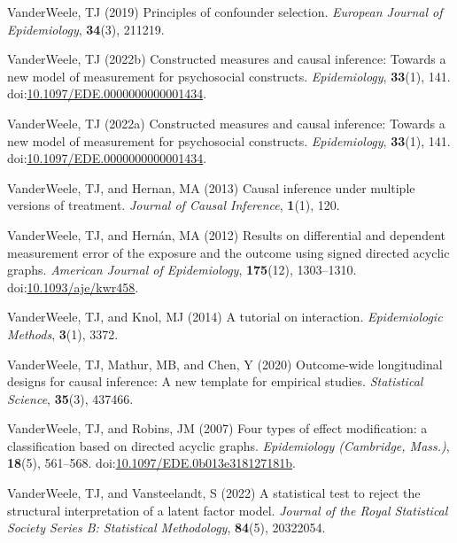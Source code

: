 \documentclass[
  singlecolumn,
  9pt]{article}
\begin{document}
\begin{CSLReferences}
VanderWeele, TJ (2019) Principles of confounder selection.
\emph{European Journal of Epidemiology}, \textbf{34}(3), 211219.

VanderWeele, TJ (2022b) Constructed measures and causal inference:
Towards a new model of measurement for psychosocial constructs.
\emph{Epidemiology}, \textbf{33}(1), 141.
doi:\href{https://doi.org/10.1097/EDE.0000000000001434}{10.1097/EDE.0000000000001434}.

VanderWeele, TJ (2022a) Constructed measures and causal inference:
Towards a new model of measurement for psychosocial constructs.
\emph{Epidemiology}, \textbf{33}(1), 141.
doi:\href{https://doi.org/10.1097/EDE.0000000000001434}{10.1097/EDE.0000000000001434}.

VanderWeele, TJ, and Hernan, MA (2013) Causal inference under multiple
versions of treatment. \emph{Journal of Causal Inference},
\textbf{1}(1), 120.

VanderWeele, TJ, and Hernán, MA (2012) Results on differential and
dependent measurement error of the exposure and the outcome using signed
directed acyclic graphs. \emph{American Journal of Epidemiology},
\textbf{175}(12), 1303--1310.
doi:\href{https://doi.org/10.1093/aje/kwr458}{10.1093/aje/kwr458}.

VanderWeele, TJ, and Knol, MJ (2014) A tutorial on interaction.
\emph{Epidemiologic Methods}, \textbf{3}(1), 3372.

VanderWeele, TJ, Mathur, MB, and Chen, Y (2020) Outcome-wide
longitudinal designs for causal inference: A new template for empirical
studies. \emph{Statistical Science}, \textbf{35}(3), 437466.

VanderWeele, TJ, and Robins, JM (2007) Four types of effect
modification: a classification based on directed acyclic graphs.
\emph{Epidemiology (Cambridge, Mass.)}, \textbf{18}(5), 561--568.
doi:\href{https://doi.org/10.1097/EDE.0b013e318127181b}{10.1097/EDE.0b013e318127181b}.

VanderWeele, TJ, and Vansteelandt, S (2022) A statistical test to reject
the structural interpretation of a latent factor model. \emph{Journal of
the Royal Statistical Society Series B: Statistical Methodology},
\textbf{84}(5), 20322054.


\end{CSLReferences}
\end{document}
